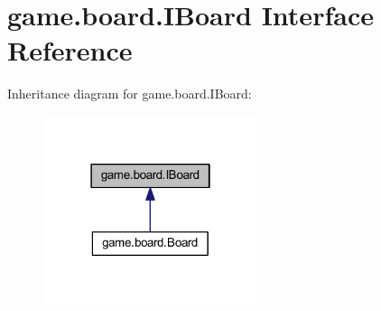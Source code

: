 \hypertarget{interfacegame_1_1board_1_1_i_board}{}\section{game.\+board.\+I\+Board Interface Reference}
\label{interfacegame_1_1board_1_1_i_board}


Inheritance diagram for game.\+board.\+I\+Board\+:
\nopagebreak
\begin{figure}[H]
\begin{center}
\leavevmode
\includegraphics[width=178pt]{interfacegame_1_1board_1_1_i_board__inherit__graph}
\end{center}
\end{figure}
